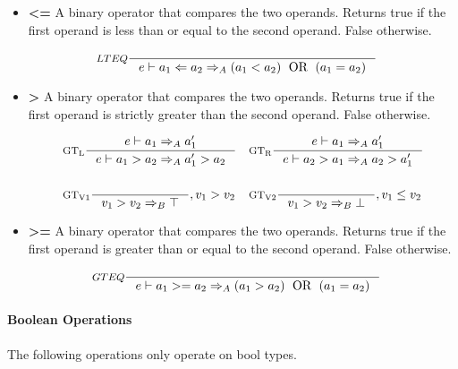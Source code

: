 \begin{itemize}
\item \textbf{<=} A binary operator that compares the two operands. Returns true if the first operand is less than or equal to the second operand. False otherwise.

\begin{align*}
&\inference[$LTEQ$]{}
                    {e \vdash a_1 <= a_2 \Rightarrow_A (a_1 < a_2) \Tor (a_1 = a_2)}
\end{align*}

\item \textbf{>} A binary operator that compares the two operands. Returns true if the first operand is strictly greater than the second operand. False otherwise.

\begin{align*}
&\inference[$\text{GT}_\text{L}$]{e \vdash a_1 \Rightarrow_A a_1'}
                    {e \vdash a_1 > a_2 \Rightarrow_A a_1' > a_2}
&
&\inference[$\text{GT}_\text{R}$]{e \vdash a_1 \Rightarrow_A a_1'}
                    {e \vdash a_2 > a_1 \Rightarrow_A a_2 > a_1'}
\\\\
&\inference[$\text{GT}_\text{V1}$]{}
                    {v_1 > v_2 \Rightarrow_B \top}
                    {, v_1 > v_2}
&
&\inference[$\text{GT}_\text{V2}$]{}
                    {v_1 > v_2 \Rightarrow_B \bot}
                    {, v_1 \leq v_2}
\end{align*}

\item \textbf{>=} A binary operator that compares the two operands. Returns true if the first operand is greater than or equal to the second operand. False otherwise.

\begin{align*}
&\inference[$GTEQ$]{}
                    {e \vdash a_1 >= a_2 \Rightarrow_A (a_1 > a_2) \Tor (a_1 = a_2)}
\end{align*}
\end{itemize}

\paragraph{Boolean Operations}
\label{sec:boolOps}

The following operations only operate on bool types.

